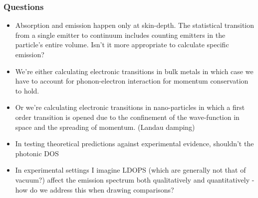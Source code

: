 \subsubsection{Questions}
\begin{itemize}
  \item Absorption and emission happen only at skin-depth. The statistical transition from a single emitter to continuum includes counting emitters in the particle's entire volume. Isn't it more appropriate to calculate specific emission?
  \item We're either calculating electronic transitions in bulk metals in which case we have to account for phonon-electron interaction for momentum conservation to hold.
  \item Or we're calculating electronic transitions in nano-particles in which a first order transition is opened due to the confinement of the wave-function in space and the spreading of momentum. (Landau damping)
  \item In testing theoretical predictions against experimental evidence, shouldn't the photonic DOS 
  \item In experimental settings I imagine LDOPS (which are generally not that of vacuum?) affect the emission spectrum both qualitatively and quantitatively - how do we address this when drawing comparisons?
\end{itemize}
